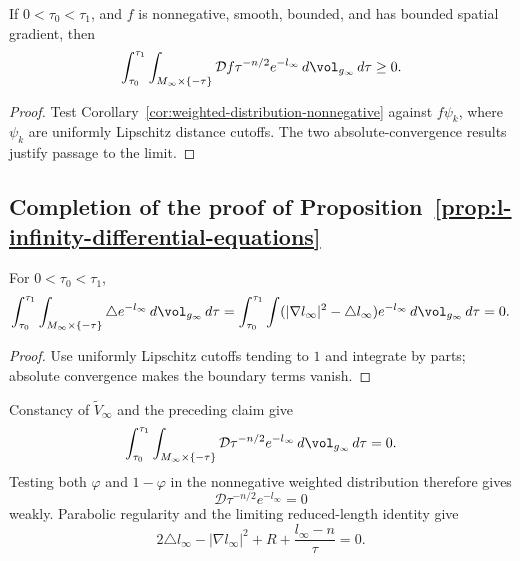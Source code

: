\begin{corollary}\label{cor:weak-inequality-nonnegative-integral}
\label{weakneg}
If $0<\tau_0<\tau_1$, and $f$ is nonnegative, smooth, bounded, and
has bounded spatial gradient, then
\[
 \int_{\tau_0}^{\tau_1}\int_{M_\infty\times\{-\tau\}}
 \mathcal D f\tau^{-n/2}e^{-l_\infty}
 \,d\vol_{g_\infty}\,d\tau\geq0.
\]
\end{corollary}
\begin{proof}
\sketch
{}
Test Corollary~\ref{cor:weighted-distribution-nonnegative} against
$f\psi_k$, where $\psi_k$ are uniformly Lipschitz distance cutoffs.
The two absolute-convergence results justify passage to the limit.
\end{proof}

\subsection{Completion of the proof of
Proposition~{\ref{prop:l-infinity-differential-equations}}}\label{sect9.2.5}

\begin{claim}\label{claim:laplacian-integral-vanishes}
For $0<\tau_0<\tau_1$,
\[
 \int_{\tau_0}^{\tau_1}\int_{M_\infty\times\{-\tau\}}
 \triangle e^{-l_\infty}\,d\vol_{g_\infty}\,d\tau
 =\int_{\tau_0}^{\tau_1}\int
 (|\nabla l_\infty|^2-\triangle l_\infty)e^{-l_\infty}
 \,d\vol_{g_\infty}\,d\tau=0.
\]
\end{claim}
\begin{proof}
\sketch
{}
Use uniformly Lipschitz cutoffs tending to $1$ and integrate by
parts; absolute convergence makes the boundary terms vanish.
\end{proof}

Constancy of $\widetilde V_\infty$ and the preceding claim give
\begin{equation}\label{tildeD}
 \int_{\tau_0}^{\tau_1}\int_{M_\infty\times\{-\tau\}}
 \mathcal D\tau^{-n/2}e^{-l_\infty}
 \,d\vol_{g_\infty}\,d\tau=0.
\end{equation}
Testing both $\varphi$ and $1-\varphi$ in the nonnegative weighted
distribution therefore gives
\begin{equation}\label{constcon}
 \mathcal D\tau^{-n/2}e^{-l_\infty}=0
\end{equation}
weakly. Parabolic regularity and the limiting reduced-length identity
give
\begin{equation}\label{wk=}
 2\triangle l_\infty-|\nabla l_\infty|^2+R
 +\frac{l_\infty-n}{\tau}=0.
\end{equation}

